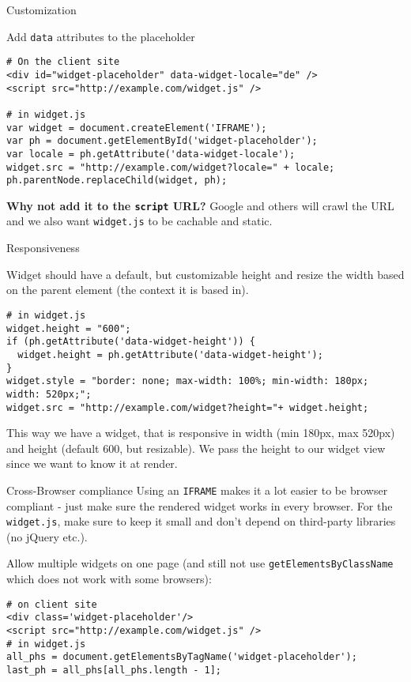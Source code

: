 \documentclass{beamer}
\begin{document}
\begin{frame}[fragile]{Customization}

\begin{block}{Add \lstinline{data} attributes to the placeholder}

  \begin{lstlisting}
# On the client site
<div id="widget-placeholder" data-widget-locale="de" />
<script src="http://example.com/widget.js" />

# in widget.js
var widget = document.createElement('IFRAME');
var ph = document.getElementById('widget-placeholder');
var locale = ph.getAttribute('data-widget-locale');
widget.src = "http://example.com/widget?locale=" + locale;
ph.parentNode.replaceChild(widget, ph);
  \end{lstlisting}

  \textbf{Why not add it to the \lstinline{script} URL?} Google and others will crawl the URL and we also want \lstinline{widget.js} to be cachable and static.
\end{block}
\end{frame}

\begin{frame}[fragile]{Responsiveness}

Widget should have a default, but customizable height and resize the width based on the parent element (the context it is based in).
\begin{lstlisting}
# in widget.js
widget.height = "600";
if (ph.getAttribute('data-widget-height')) {
  widget.height = ph.getAttribute('data-widget-height');
}
widget.style = "border: none; max-width: 100%; min-width: 180px; width: 520px;";
widget.src = "http://example.com/widget?height="+ widget.height;
\end{lstlisting}
This way we have a widget, that is responsive in width (min 180px, max 520px) and height (default 600, but resizable). We pass the height to our widget view since we want to know it at render.
\end{frame}

\begin{frame}[fragile]{Cross-Browser compliance}
Using an \lstinline{IFRAME} makes it a lot easier to be browser compliant - just make sure the rendered widget works in every browser. For the \lstinline{widget.js}, make sure to keep it small and don't depend on third-party libraries (no jQuery etc.).


Allow multiple widgets on one page (and still not use \lstinline{getElementsByClassName} which does not work with some browsers):
\begin{lstlisting}
# on client site
<div class='widget-placeholder'/>
<script src="http://example.com/widget.js" />
# in widget.js
all_phs = document.getElementsByTagName('widget-placeholder');
last_ph = all_phs[all_phs.length - 1];
\end{lstlisting}
\end{frame}
\end{document}

